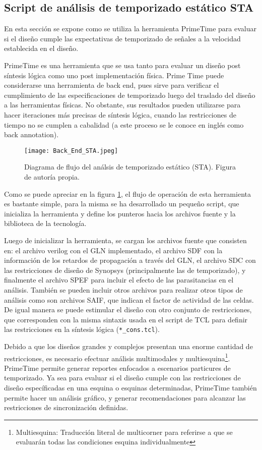 \subsection{Script de análisis de temporizado estático STA}
\label{sec:STA}

En esta sección se expone como se utiliza la herramienta PrimeTime para evaluar si el diseño cumple las expectativas de temporizado de señales a la velocidad establecida en el diseño.

PrimeTime es una herramienta que se usa tanto para evaluar un diseño post síntesis lógica como uno post implementación física. Prime Time puede considerarse una herramienta de back end, pues sirve para verificar el cumplimiento de las especificaciones de temporizado luego del traslado del diseño a las herramientas físicas.  No obstante, sus resultados pueden utilizarse para hacer iteraciones más precisas de síntesis lógica, cuando las restricciones de tiempo no se cumplen a cabalidad (a este proceso se le conoce en inglés como back annotation).

\begin{figure}[ht]
\texttt{[image: Back\_End\_STA.jpeg]}
\caption{Diagrama de flujo del análsis de temporizado estático (STA). Figura de autoría propia.}
\label{fig:staflow}
\end{figure}

Como se puede apreciar en la figura \ref{fig:staflow}, el flujo de operación de esta herramienta es bastante simple, para la misma se ha desarrollado un pequeño script, que inicializa la herramienta y define los punteros hacia los archivos fuente y la biblioteca de la tecnología.

Luego de inicializar la herramienta, se cargan los archivos fuente que consisten en: el archivo verilog con el GLN implementado, el archivo SDF con la información de los retardos de propagación a través del GLN, el archivo SDC con las restricciones de diseño de Synopsys (principalmente las de temporizado), y finalmente el archivo SPEF para incluir el efecto de las parasitancias en el análisis. También se pueden incluir otros archivos para realizar otros tipos de análisis como son archivos SAIF, que indican el factor de actividad de las celdas. De igual manera se puede estimular el diseño con otro conjunto de restricciones, que corresponden con la misma sintaxis usada en el script de TCL para definir las restricciones en la síntesis lógica (\texttt{*\_cons.tcl}).

Debido a que los diseños grandes y complejos presentan una enorme cantidad de restricciones, es necesario efectuar análisis multimodales y multiesquina\footnote{Multiesquina: Traducción literal de multicorner para referirse a que se evaluarán todas las condiciones esquina individualmente}. PrimeTime permite generar reportes enfocados a escenarios particures de temporizado. Ya sea para evaluar si el diseño cumple con las restricciones de diseño específicadas en una esquina o esquinas determinadas, PrimeTime también permite hacer un análisis gráfico, y generar recomendaciones para alcanzar las restricciones de sincronización definidas.

